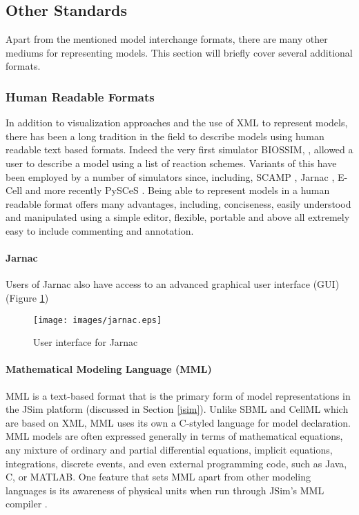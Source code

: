 \documentclass[]{article}
\makeatletter
\def\maxwidth{\ifdim\Gin@nat@width>\linewidth\linewidth
\else\Gin@nat@width\fi}
\let\Oldincludegraphics\includegraphics
\renewcommand{\includegraphics}[1]{\Oldincludegraphics[width=\maxwidth]{#1}}
\makeatother
\begin{document}
\subsection{Other Standards}

Apart from the mentioned model interchange formats, there are many other
mediums for representing models. This section will briefly cover several
additional formats.

\subsubsection{Human Readable Formats}

In addition to visualization approaches and the use of XML to represent
models, there has been a long tradition in the field to describe models
using human readable text based formats. Indeed the very first simulator
BIOSSIM, \autocite{Ga68}, allowed a user to describe a model using a
list of reaction schemes. Variants of this have been employed by a
number of simulators since, including, SCAMP \autocite{SauroF91}, Jarnac
\autocite{sauro:2000}, E-Cell \autocite{ECELL} and more recently PySCeS
\autocite{Pysces2004}. Being able to represent models in a human
readable format offers many advantages, including, conciseness, easily
understood and manipulated using a simple editor, flexible, portable and
above all extremely easy to include commenting and annotation.

\paragraph{Jarnac}

Users of Jarnac also have access to an advanced graphical user interface
(GUI) (Figure \ref{Figure:jarnac})

\begin{figure}[htbp]
\centering
\texttt{[image: images/jarnac.eps]}
\caption{User interface for Jarnac\label{Figure:jarnac}}
\end{figure}

\paragraph{Mathematical Modeling Language (MML)}

MML is a text-based format that is the primary form of model
representations in the JSim platform \autocite{raymond03} (discussed in
Section \ref{jsim}). Unlike SBML and CellML which are based on XML, MML
uses its own a C-styled language for model declaration. MML models are
often expressed generally in terms of mathematical equations, any
mixture of ordinary and partial differential equations, implicit
equations, integrations, discrete events, and even external programming
code, such as Java, C, or MATLAB. One feature that sets MML apart from
other modeling languages is its awareness of physical units when run
through JSim's MML compiler \autocite{chizeck2009}.
\end{document}
